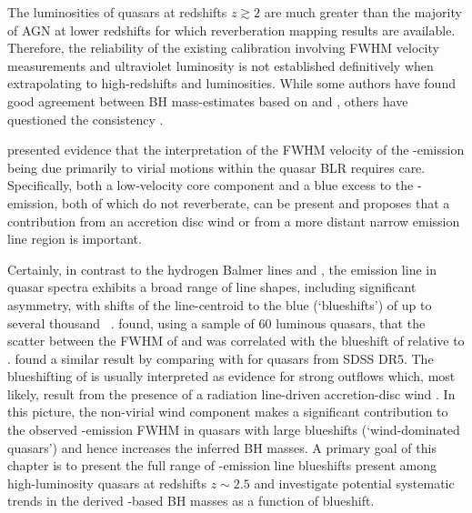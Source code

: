 The luminosities of quasars at redshifts $z\gtrsim 2$ are much greater than the majority of AGN at lower redshifts for which reverberation mapping results are available.  
Therefore, the reliability of the existing calibration involving  FWHM velocity measurements and ultraviolet luminosity is not established definitively when extrapolating to high-redshifts and luminosities. 
While some authors have found good agreement between BH mass-estimates based on  and \hb \citep[e.g.][]{vestergaard06, assef11, tilton13}, others have questioned the consistency \citep[e.g.][]{baskin05,trakhtenbrot12,shen12}.  

\citet{denney12} presented evidence that the interpretation of the FWHM velocity of the -emission being due primarily to virial motions within the quasar BLR requires care.  
Specifically, both a low-velocity core component and a blue excess to the -emission, both of which do not reverberate, can be present and \citet{denney12} proposes that a contribution from an accretion disc wind or from a more distant narrow emission line region is important.

Certainly, in contrast to the hydrogen Balmer lines and , the  emission line in quasar spectra exhibits a broad range of line shapes, including significant asymmetry, with shifts of the line-centroid to the blue (`blueshifts') of up to several thousand \kms\, \citep{richards02,baskin05,sulentic06}.  
\citet{shen12} found, using a sample of 60 luminous quasars, that the scatter between the FWHM of  and \hb was correlated with the blueshift of  relative to \hbns. 
\citet{shen08} found a similar result by comparing  with  for quasars from SDSS DR5.  
The blueshifting of  is usually interpreted as evidence for strong outflows \citep[e.g.][]{sulentic07, richards11} which, most likely, result from the presence of a radiation line-driven accretion-disc wind \citep[e.g.][]{konigl94, murray95, proga00, everett05, gallagher15}.  
In this picture, the non-virial wind component makes a significant contribution to the observed -emission FWHM in quasars with large  blueshifts (`wind-dominated quasars') and hence increases the inferred BH masses.
A primary goal of this chapter is to present the full range of -emission line blueshifts present among high-luminosity quasars at redshifts $z\sim2.5$ and investigate potential systematic trends in the derived -based BH masses as a function of blueshift.

